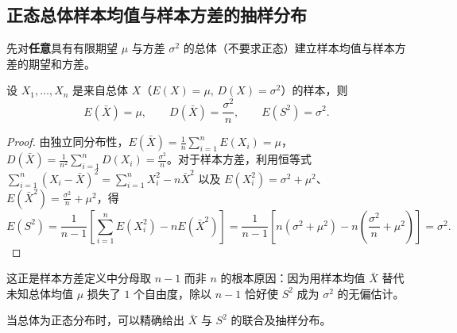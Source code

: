 
\subsection{正态总体样本均值与样本方差的抽样分布}

先对\textbf{任意}具有有限期望 $\mu$ 与方差 $\sigma^2$ 的总体（不要求正态）建立样本均值与样本方差的期望和方差。

\begin{proposition}[样本均值与样本方差的无偏性]
\label{prop:sample-mean-var-moments}
设 $X_1,\ldots,X_n$ 是来自总体 $X$（$E(X)=\mu,\,D(X)=\sigma^2$）的样本，则
\begin{equation}
  E(\bar{X})=\mu,\qquad D(\bar{X})=\frac{\sigma^2}{n},\qquad E(S^2)=\sigma^2.
  \label{eq:sample-moments}
\end{equation}
\end{proposition}
\begin{proof}
由独立同分布性，$E(\bar{X})=\frac{1}{n}\sum_{i=1}^{n}E(X_i)=\mu$，$D(\bar{X})=\frac{1}{n^2}\sum_{i=1}^{n}D(X_i)=\frac{\sigma^2}{n}$。对于样本方差，利用恒等式 $\sum_{i=1}^{n}(X_i-\bar{X})^2=\sum_{i=1}^{n}X_i^2-n\bar{X}^2$ 以及 $E(X_i^2)=\sigma^2+\mu^2$、$E(\bar{X}^2)=\frac{\sigma^2}{n}+\mu^2$，得
\[
  E(S^2)=\frac{1}{n-1}\left[\sum_{i=1}^{n}E(X_i^2)-nE(\bar{X}^2)\right]
  =\frac{1}{n-1}\left[n(\sigma^2+\mu^2)-n\left(\frac{\sigma^2}{n}+\mu^2\right)\right]
  =\sigma^2.
\]
\end{proof}

这正是样本方差定义中分母取 $n-1$ 而非 $n$ 的根本原因：因为用样本均值 $\bar{X}$ 替代未知总体均值 $\mu$ 损失了 $1$ 个自由度，除以 $n-1$ 恰好使 $S^2$ 成为 $\sigma^2$ 的无偏估计。

当总体为正态分布时，可以精确给出 $\bar{X}$ 与 $S^2$ 的联合及抽样分布。

